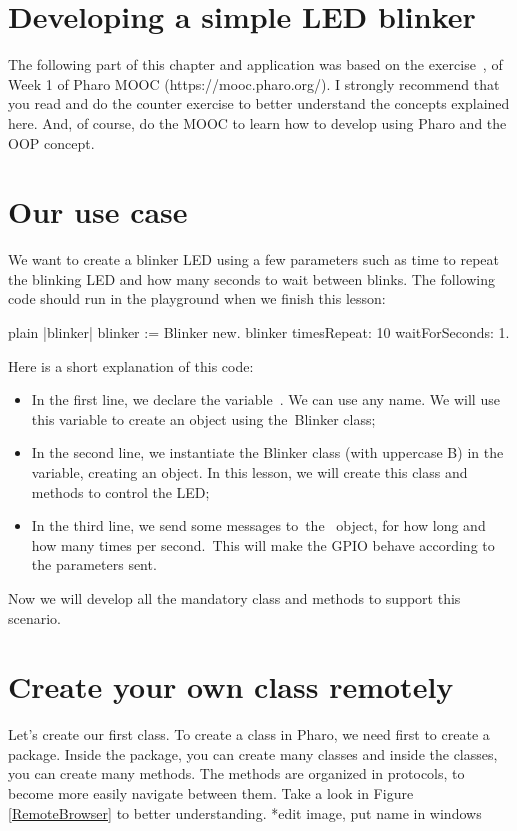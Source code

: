 \documentclass[10pt,twoside,english]{_support/latex/sbabook/sbabook}
\begin{document}
\section{Developing a simple LED blinker}
The following part of this chapter and application was based on the exercise , of Week 1 of Pharo MOOC (https://mooc.pharo.org/). I strongly recommend that you read and do the counter exercise to better understand the concepts explained here. And, of course, do the MOOC to learn how to develop using Pharo and the OOP concept.
\section{Our use case}
We want to create a blinker LED using a few parameters such as time to repeat the blinking LED and how many seconds to wait between blinks. The following code should run in the playground when we finish this lesson:

\begin{displaycode}{plain}
|blinker|
blinker := Blinker new.
blinker timesRepeat: 10 waitForSeconds: 1.
\end{displaycode}

Here is a short explanation of this code:

\begin{itemize}
\item In the first line, we declare the variable . We can use any name. We will use this variable to create an object using the Blinker class;
\item In the second line, we instantiate the Blinker class (with uppercase B) in the  variable, creating an object. In this lesson, we will create this class and methods to control the LED;
\item In the third line, we send some messages to the  object, for how long and how many times per second. This will make the GPIO behave according to the parameters sent.
\end{itemize}

Now we will develop all the mandatory class and methods to support this scenario.
\section{Create your own class remotely}
Let's create our first class. To create a class in Pharo, we need first to create a package. Inside the package, you can create many classes and inside the classes, you can create many methods. The methods are organized in protocols, to become more easily navigate between them. Take a look in Figure \ref{RemoteBrowser} to better understanding. *edit image, put name in windows
\end{document}
